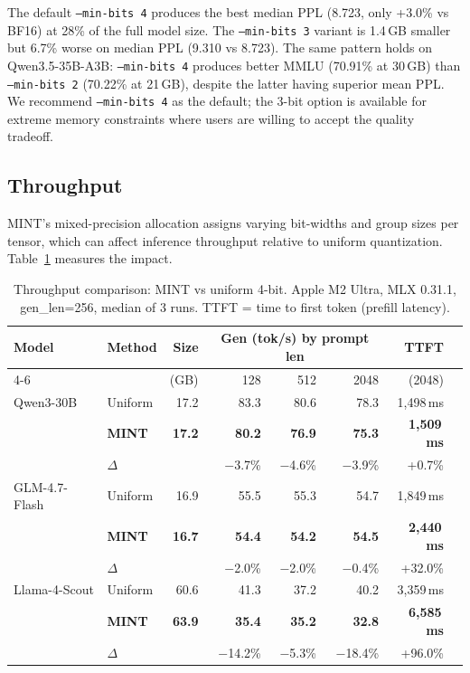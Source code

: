 \documentclass{article}
\begin{document}
The default \texttt{--min-bits 4} produces the best median PPL (8.723, only +3.0\% vs BF16) at 28\% of the full model size. The \texttt{--min-bits 3} variant is 1.4\,GB smaller but 6.7\% worse on median PPL (9.310 vs 8.723). The same pattern holds on Qwen3.5-35B-A3B: \texttt{--min-bits 4} produces better MMLU (70.91\% at 30\,GB) than \texttt{--min-bits 2} (70.22\% at 21\,GB), despite the latter having superior mean PPL. We recommend \texttt{--min-bits 4} as the default; the 3-bit option is available for extreme memory constraints where users are willing to accept the quality tradeoff.

\subsection{Throughput}
\label{sec:throughput}

MINT's mixed-precision allocation assigns varying bit-widths and group sizes per tensor, which can affect inference throughput relative to uniform quantization. Table~\ref{tab:throughput} measures the impact.

\begin{table}[h]
\centering
\caption{Throughput comparison: MINT vs uniform 4-bit. Apple M2 Ultra, MLX 0.31.1, gen\_len=256, median of 3 runs. TTFT = time to first token (prefill latency).}
\label{tab:throughput}
\begin{tabular}{llrrrrrr}
\toprule
Model & Method & Size & \multicolumn{3}{c}{Gen (tok/s) by prompt len} & TTFT \\
\cmidrule(lr){4-6}
 & & (GB) & 128 & 512 & 2048 & (2048) \\
\midrule
Qwen3-30B & Uniform & 17.2 & 83.3 & 80.6 & 78.3 & 1{,}498\,ms \\
 & \textbf{MINT} & \textbf{17.2} & \textbf{80.2} & \textbf{76.9} & \textbf{75.3} & \textbf{1{,}509\,ms} \\
 & $\Delta$ & & $-$3.7\% & $-$4.6\% & $-$3.9\% & +0.7\% \\
\midrule
GLM-4.7-Flash & Uniform & 16.9 & 55.5 & 55.3 & 54.7 & 1{,}849\,ms \\
 & \textbf{MINT} & \textbf{16.7} & \textbf{54.4} & \textbf{54.2} & \textbf{54.5} & \textbf{2{,}440\,ms} \\
 & $\Delta$ & & $-$2.0\% & $-$2.0\% & $-$0.4\% & +32.0\% \\
\midrule
Llama-4-Scout & Uniform & 60.6 & 41.3 & 37.2 & 40.2 & 3{,}359\,ms \\
 & \textbf{MINT} & \textbf{63.9} & \textbf{35.4} & \textbf{35.2} & \textbf{32.8} & \textbf{6{,}585\,ms} \\
 & $\Delta$ & & $-$14.2\% & $-$5.3\% & $-$18.4\% & +96.0\% \\
\bottomrule
\end{tabular}
\end{table}
\end{document}
